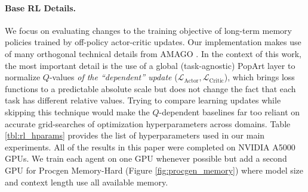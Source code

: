 \documentclass{article}
\begin{document}
\paragraph{Base RL Details.} We focus on evaluating changes to the training objective of long-term memory policies trained by off-policy actor-critic updates. Our implementation makes use of many orthogonal technical details from AMAGO \cite{grigsby2024amago}. In the context of this work, the most important detail is the use of a global (task-agnostic) PopArt \cite{hessel2019multi} layer to normalize $Q$-values \textit{of the ``dependent'' update} ($\mathcal{L}_{\text{Actor}}, \mathcal{L}_{\text{Critic}}$), which brings loss functions to a predictable absolute scale but does not change the fact that each task has different relative values. Trying to compare learning updates while skipping this technique would make the $Q$-dependent baselines far too reliant on accurate grid-searches of optimization hyperparameters across domains. Table \ref{tbl:rl_hparams} provides the list of hyperparameters used in our main experiments. All of the results in this paper were completed on NVIDIA A5000 GPUs. We train each agent on one GPU whenever possible but add a second GPU for Procgen Memory-Hard (Figure \ref{fig:procgen_memory}) where model size and context length use all available memory.
\end{document}
